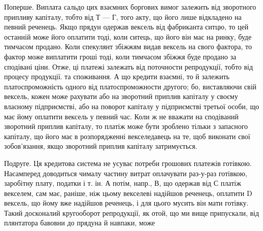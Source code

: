 Поперше. Виплата сальдо цих взаємних боргових вимог залежить від
зворотного припливу капіталу, тобто від Т — Г, того акту, що його лише відкладено
на певний реченець. Якщо прядун одержав вексель від фабриканта ситцю,
то цей останній може його оплатити тоді, коли ситець, що його він має на
ринку, буде тимчасом продано. Коли спекулянт збіжжям видав вексель на свого
фактора, то фактор може виплатити гроші тоді, коли тимчасом збіжжя буде продано
за сподівані ціни. Отже, ці платежі залежать від поточности репродукції,
тобто від процесу продукції. та споживання. А що кредити взаємні, то й залежить
платоспроможність одного від платоспроможности другого; бо, виставляючи
свій вексель, кожен може рахувати або на зворотний приплив капіталу у своєму
власному підприємстві, або на поворот капіталу у підприємстві третьої особи,
що має йому оплатити вексель у певний час. Коли ж не вважати на сподіваний
зворотний приплив капіталу, то платіж може бути зроблено тільки з запасного
капіталу, що його має в розпорядженні векселедавець на те, щоб виконати свої
зобов’язання, якщо зворотний приплив капіталу затримується.

Подруге. Ця кредитова система не усуває потреби грошових платежів
готівкою. Насамперед доводиться чималу частину витрат оплачувати раз-у-раз
готівкою, заробітну плату, податки і т. ін. А потім, напр., В, що одержав від
С платіж векселем, сам має, раніше, ніж цьому векселеві надійшов реченець,
оплатити D вексель, що йому вже надійшов реченець, і для цього мусить
він мати готівку. Такий досконалий кругооборот репродукції, як отой, що ми
вище припускали, від плянтатора бавовни до прядуна й навпаки, може
\parbreak{}  %
